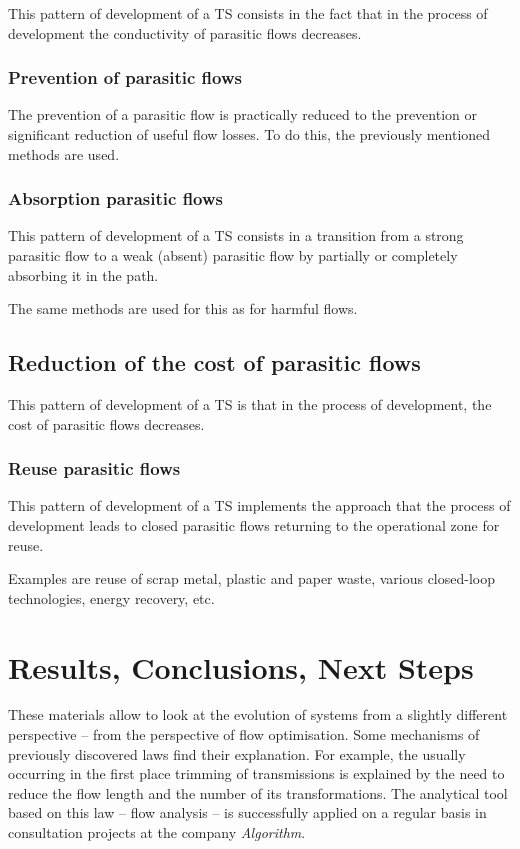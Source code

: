\documentclass[a4paper,11pt]{article}
\begin{document}
This pattern of development of a TS consists in the fact that in the process
of development the conductivity of parasitic flows decreases.

\subsubsection{Prevention of parasitic flows}

The prevention of a parasitic flow is practically reduced to the prevention or
significant reduction of useful flow losses. To do this, the previously
mentioned methods are used.

\subsubsection{Absorption parasitic flows}

This pattern of development of a TS consists in a transition from a strong
parasitic flow to a weak (absent) parasitic flow by partially or completely
absorbing it in the path.

The same methods are used for this as for harmful flows.

\subsection{Reduction of the cost of parasitic flows}

This pattern of development of a TS is that in the process of development, the
cost of parasitic flows decreases.

\subsubsection{Reuse parasitic flows}

This pattern of development of a TS implements the approach that the process
of development leads to closed parasitic flows returning to the operational
zone for reuse.

Examples are reuse of scrap metal, plastic and paper waste, various
closed-loop technologies, energy recovery, etc.

\section*{Results, Conclusions, Next Steps}

These materials allow to look at the evolution of systems from a slightly
different perspective -- from the perspective of flow optimisation. Some
mechanisms of previously discovered laws find their explanation. For example,
the usually occurring in the first place trimming of transmissions is
explained by the need to reduce the flow length and the number of its
transformations. The analytical tool based on this law -- flow analysis -- is
successfully applied on a regular basis in consultation projects at the
company \emph{Algorithm}.
\end{document}
